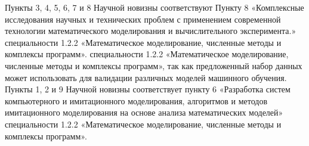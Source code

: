 {\appropriation}
Пункты 3, 4, 5, 6, 7 и 8 Научной новизны соответствуют Пункту 8 «Комплексные исследования научных и технических проблем с применением современной технологии математического моделирования и вычислительного эксперимента.» специальности 1.2.2 «Математическое моделирование, численные методы и комплексы программ». специальности 1.2.2 «Математическое моделирование, численные методы и комплексы программ», так как предложенный набор данных может использовать для валидации различных моделей машинного обучения. Пункты 1, 2 и 9 Научной новизны соответствует пункту 6 «Разработка систем компьютерного и имитационного моделирования, алгоритмов и методов имитационного моделирования на основе анализа математических моделей» специальности 1.2.2 «Математическое моделирование, численные методы и комплексы программ».

